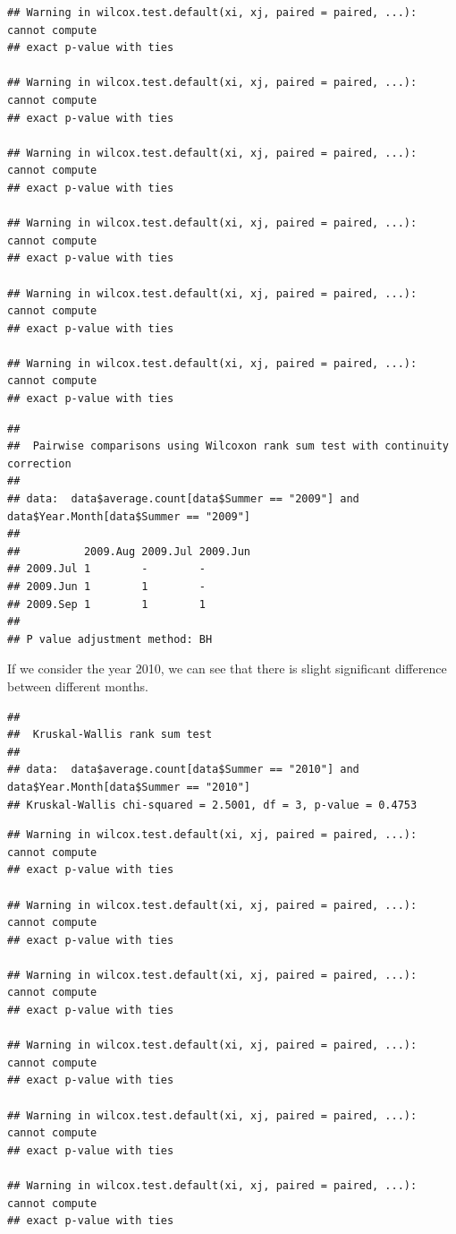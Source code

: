 \documentclass[
]{article}
\begin{document}
\begin{verbatim}
## Warning in wilcox.test.default(xi, xj, paired = paired, ...): cannot compute
## exact p-value with ties

## Warning in wilcox.test.default(xi, xj, paired = paired, ...): cannot compute
## exact p-value with ties

## Warning in wilcox.test.default(xi, xj, paired = paired, ...): cannot compute
## exact p-value with ties

## Warning in wilcox.test.default(xi, xj, paired = paired, ...): cannot compute
## exact p-value with ties

## Warning in wilcox.test.default(xi, xj, paired = paired, ...): cannot compute
## exact p-value with ties

## Warning in wilcox.test.default(xi, xj, paired = paired, ...): cannot compute
## exact p-value with ties
\end{verbatim}

\begin{verbatim}
## 
##  Pairwise comparisons using Wilcoxon rank sum test with continuity correction 
## 
## data:  data$average.count[data$Summer == "2009"] and data$Year.Month[data$Summer == "2009"] 
## 
##          2009.Aug 2009.Jul 2009.Jun
## 2009.Jul 1        -        -       
## 2009.Jun 1        1        -       
## 2009.Sep 1        1        1       
## 
## P value adjustment method: BH
\end{verbatim}

If we consider the year 2010, we can see that there is slight
significant difference between different months.

\begin{verbatim}
## 
##  Kruskal-Wallis rank sum test
## 
## data:  data$average.count[data$Summer == "2010"] and data$Year.Month[data$Summer == "2010"]
## Kruskal-Wallis chi-squared = 2.5001, df = 3, p-value = 0.4753
\end{verbatim}

\begin{verbatim}
## Warning in wilcox.test.default(xi, xj, paired = paired, ...): cannot compute
## exact p-value with ties

## Warning in wilcox.test.default(xi, xj, paired = paired, ...): cannot compute
## exact p-value with ties

## Warning in wilcox.test.default(xi, xj, paired = paired, ...): cannot compute
## exact p-value with ties

## Warning in wilcox.test.default(xi, xj, paired = paired, ...): cannot compute
## exact p-value with ties

## Warning in wilcox.test.default(xi, xj, paired = paired, ...): cannot compute
## exact p-value with ties

## Warning in wilcox.test.default(xi, xj, paired = paired, ...): cannot compute
## exact p-value with ties
\end{verbatim}
\end{document}
